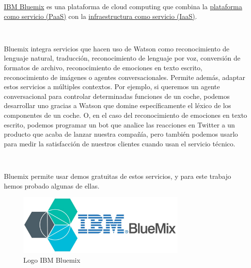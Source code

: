\documentclass[paper=a4, fontsize=10pt]{scrartcl} %
\numberwithin{equation}{section} %
\numberwithin{figure}{section} %
\numberwithin{table}{section} %
\begin{document}
\begin{minipage}{\linewidth}
	\centering
	\begin{minipage}{0.45\linewidth}
\href{https://www.ibm.com/cloud-computing/bluemix/es/node/2041}{IBM Bluemix} \cite{bluemix-doc} es una plataforma de cloud computing que combina la \href{https://azure.microsoft.com/es-es/overview/what-is-paas/}{plataforma como servicio (PaaS)} con la \href{https://azure.microsoft.com/es-es/overview/what-is-iaas/}{infraestructura como servicio (IaaS)}.

\

Bluemix integra servicios que hacen uso de Watson como reconocimiento de lenguaje natural, traducción, reconocimiento de lenguaje por voz, conversión de formatos de archivo, reconocimiento de emociones en texto escrito, reconocimiento de imágenes o agentes conversacionales. Permite además, adaptar estos servicios a múltiples contextos. Por ejemplo, si queremos un agente conversacional para controlar determinadas funciones de un coche, podemos desarrollar uno gracias a Watson que domine específicamente el léxico de los componentes de un coche. O, en el caso del reconocimiento de emociones en texto escrito, podemos programar un bot que analice las reacciones en Twitter a un producto que acaba de lanzar nuestra compañía, pero también podemos usarlo para medir la satisfacción de nuestros clientes cuando usan el servicio técnico.

\

Bluemix permite usar demos gratuitas de estos servicios, y para este trabajo hemos probado algunas de ellas.

	\end{minipage}
	\hspace{0.1cm}
	\begin{minipage}{0.45\linewidth}
		\begin{figure}[H]
			\centering
			\label{ibm-bluemix.jpg}
			\includegraphics[width=0.75\textwidth]{./Imagenes/ibm-bluemix.jpg}
			\caption{Logo IBM Bluemix \cite{bluemix-image}}
		\end{figure}
	\end{minipage}
\end{minipage}
\end{document}
